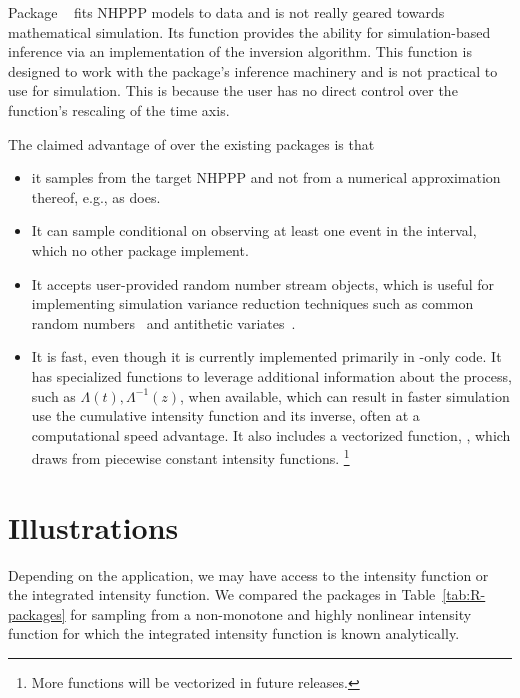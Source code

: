 \documentclass[article,nojss]{jss}\usepackage[]{graphicx}\usepackage[]{xcolor}
\newcommand{\fct}[1]{\code{#1()}}
\begin{document}
Package ~\citep{NHPoisson-jss, NHPoisson-package} fits NHPPP models to data and is not really geared towards mathematical simulation. Its \fct{simNHP.fun} function provides the ability for simulation-based inference via an implementation of the inversion algorithm. This function is designed to work with the package's inference machinery and is not practical to use for simulation. This is because the user has no direct control over the function's rescaling of the time axis.

The claimed advantage of  over the existing packages is that
\begin{itemize}
\item it samples from the target NHPPP and not from a numerical approximation thereof, e.g., as  does.
\item It can  sample conditional on observing at least one event in the interval, which no other package implement.
\item It accepts user-provided random number stream objects, which is useful for implementing simulation variance reduction techniques such as common random numbers~\citep{wright1979crn} and antithetic variates~\citep{hammersley1956av}.
\item It is fast, even though it is currently implemented primarily in -only code. It has specialized functions to leverage additional information about the process, such as $\Lambda(t), \Lambda^{-1}(z)$, when available, which can result in faster simulation  use the cumulative intensity function and its inverse, often at a computational speed advantage. It also includes a vectorized function, \fct{vdraw\_sc\_step\_regular}, which draws from piecewise constant intensity functions.%
\footnote{More functions will be vectorized in future releases.}
\end{itemize}



\newpage
\section{Illustrations} \label{sec:illustrations}

Depending on the application, we may have access to the intensity function
or the integrated intensity function.
We compared the  packages in Table~\ref{tab:R-packages} for sampling from a non-monotone and highly nonlinear intensity function for which the integrated intensity function is known analytically.
\end{document}

